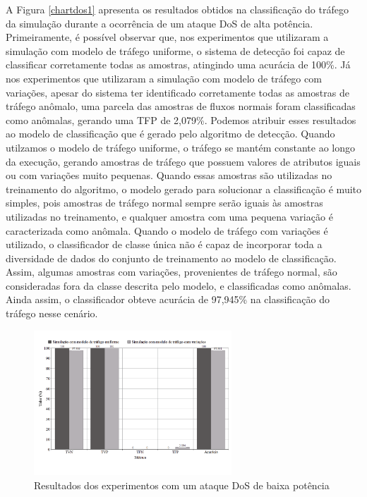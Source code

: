 \documentclass[12pt]{article}
\begin{document}
A Figura \ref{chartdos1} apresenta os resultados obtidos na classificação do tráfego da simulação durante a ocorrência de um ataque DoS de alta potência. Primeiramente, é possível observar que, nos experimentos que utilizaram a simulação com modelo de tráfego uniforme, o sistema de detecção foi capaz de classificar corretamente todas as amostras, atingindo uma acurácia de 100\%. Já nos experimentos que utilizaram a simulação com modelo de tráfego com variações, apesar do sistema ter identificado corretamente todas as amostras de tráfego anômalo, uma parcela das amostras de fluxos normais foram classificadas como anômalas, gerando uma TFP de 2,079\%. Podemos atribuir esses resultados ao modelo de classificação que é gerado pelo algoritmo de detecção. Quando utilzamos o modelo de tráfego uniforme, o tráfego se mantém constante ao longo da execução, gerando amostras de tráfego que possuem valores de atributos iguais ou com variações muito pequenas. Quando essas amostras são utilizadas no treinamento do algoritmo, o modelo gerado para solucionar a classificação é muito simples, pois amostras de tráfego normal sempre serão iguais às amostras utilizadas no treinamento, e qualquer amostra com uma pequena variação é caracterizada como anômala. Quando o modelo de tráfego com variações é utilizado, o classificador de classe única não é capaz de incorporar toda a diversidade de dados do conjunto de treinamento ao modelo de classificação. Assim, algumas amostras com variações, provenientes de tráfego normal, são consideradas fora da classe descrita pelo modelo, e classificadas como anômalas. Ainda assim, o classificador obteve acurácia de 97,945\% na classificação do tráfego nesse cenário.

\begin{figure}[h]
   \caption{Resultados dos experimentos com um ataque DoS de baixa potência}
   \begin{center}
       \includegraphics[width=20em]{chartdos2}
   \end{center}
   \label{chartdos2}
\end{figure}
\end{document}
